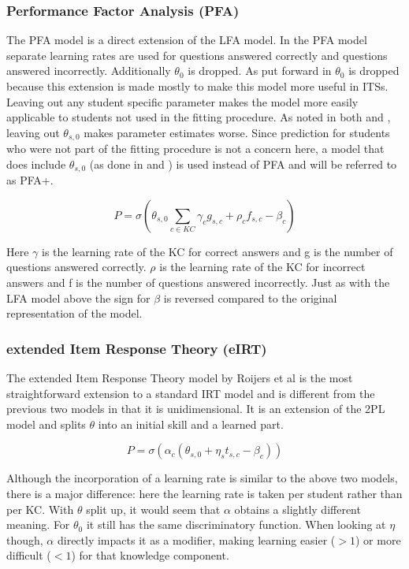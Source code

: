 \documentclass{scrartcl}
\begin{document}
\subsubsection{Performance Factor Analysis (PFA)}
\label{sec:pfa}
The PFA model is a direct extension of the LFA model. In the PFA model separate learning rates are used for questions answered correctly and questions answered incorrectly. Additionally $\theta_{0}$ is dropped. As put forward in \cite{pfa} $\theta_{0}$ is dropped because this extension is made mostly to make this model more useful in ITSs. Leaving out any student specific parameter makes the model more easily applicable to students not used in the fitting procedure. As noted in both \cite{ktpfa} and \cite{blackart}, leaving out $\theta_{s,0}$ makes parameter estimates worse. Since prediction for students who were not part of the fitting procedure is not a concern here, a model that does include $\theta_{s,0}$ (as done in \cite{ktpfa} and \cite{blackart}) is used instead of PFA and will be referred to as PFA+.

\begin{equation}
\label{eq:pfa}
P = \sigma(\theta_{s,0} \sum_{c \in KC}  \gamma_{c} g_{s,c} + \rho_{c} f_{s,c} - \beta_{c})
\end{equation}


Here $\gamma$ is the learning rate of the KC for correct answers and g is the number of questions answered correctly. $\rho$ is the learning rate of the KC for incorrect answers and f is the number of questions answered incorrectly. Just as with the LFA model above the sign for $\beta$ is reversed compared to the original representation of the model.

\subsubsection{extended Item Response Theory (eIRT)}
\label{sec:eirt}
The extended Item Response Theory model by Roijers et al \cite{eirt} is the most straightforward extension to a standard IRT model and is different from the previous two models in that it is unidimensional. It is an extension of the 2PL model and splits $\theta$ into an initial skill and a learned part. 

\begin{equation}
\label{eq:eirt}
P = \sigma(\alpha_{c} (\theta_{s,0} + \eta_{s} t_{s,c} - \beta_{c}))
\end{equation}

Although the incorporation of a learning rate is similar to the above two models, there is a major difference: here the learning rate is taken per student rather than per KC. With $\theta$ split up, it would seem that $\alpha$ obtains a slightly different meaning. For $\theta_{0}$ it still has the same discriminatory function. When looking at $\eta$ though, $\alpha$ directly impacts it as a modifier, making learning easier ($>1$) or more difficult ($<1$) for that knowledge component.
\end{document}
